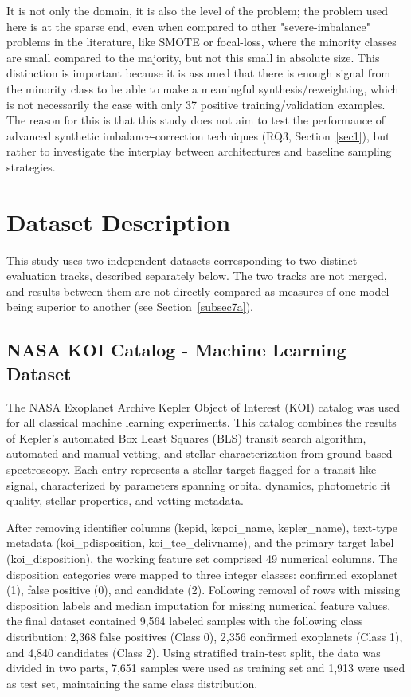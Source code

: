 \documentclass[preprint,11pt,times]{elsarticle}
\begin{document}
It is not only the domain, it is also the level of the problem; the problem used here is at the sparse end, even when compared to other "severe-imbalance" problems in the literature, like SMOTE or focal-loss, where the minority classes are small compared to the majority, but not this small in absolute size. This distinction is important because it is assumed that there is enough signal from the minority class to be able to make a meaningful synthesis/reweighting, which is not necessarily the case with only 37 positive training/validation examples. The reason for this is that this study does not aim to test the performance of advanced synthetic imbalance-correction techniques (RQ3, Section~\ref{sec1}), but rather to investigate the interplay between architectures and baseline sampling strategies.

\section{Dataset Description}\label{sec3}

This study uses two independent datasets corresponding to two distinct evaluation tracks, described separately below. The two tracks are not merged, and results between them are not directly compared as measures of one model being superior to another (see Section~\ref{subsec7a}).

\subsection{NASA KOI Catalog - Machine Learning Dataset}\label{subsec3a}

The NASA Exoplanet Archive Kepler Object of Interest (KOI) catalog was used for all classical machine learning experiments. This catalog combines the results of Kepler's automated Box Least Squares (BLS) transit search algorithm, automated and manual vetting, and stellar characterization from ground-based spectroscopy. Each entry represents a stellar target flagged for a transit-like signal, characterized by parameters spanning orbital dynamics, photometric fit quality, stellar properties, and vetting metadata.

After removing identifier columns (kepid, kepoi\_name, kepler\_name), text-type metadata (koi\_pdisposition, koi\_tce\_delivname), and the primary target label (koi\_disposition), the working feature set comprised 49 numerical columns. The disposition categories were mapped to three integer classes: confirmed exoplanet (1), false positive (0), and candidate (2). Following removal of rows with missing disposition labels and median imputation for missing numerical feature values, the final dataset contained 9,564 labeled samples with the following class distribution: 2,368 false positives (Class 0), 2,356 confirmed exoplanets (Class 1), and 4,840 candidates (Class 2). Using stratified train-test split, the data was divided in two parts, 7,651 samples were used as training set and 1,913 were used as test set, maintaining the same class distribution.
\end{document}
